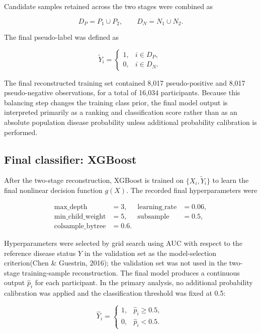 \documentclass[10pt]{article}
\begin{document}
Candidate samples retained across the two stages were combined as

\[D_{P} = P_{1} \cup P_{2},\quad\quad D_{N} = N_{1} \cup N_{2}.\]

The final pseudo-label was defined as

\[{\widetilde{Y}}_{i} = \left\{ \begin{matrix}
1, & i \in D_{P}, \\
0, & i \in D_{N}.
\end{matrix} \right.\ \]

The final reconstructed training set contained 8,017 pseudo-positive and
8,017 pseudo-negative observations, for a total of 16,034 participants.
Because this balancing step changes the training class prior, the final
model output is interpreted primarily as a ranking and classification
score rather than as an absolute population disease probability unless
additional probability calibration is performed.

\subsection{Final classifier: XGBoost}\label{final-classifier-xgboost}

After the two-stage reconstruction, XGBoost is trained on
\(\{ X_{i},{\widetilde{Y}}_{i}\}\) to learn the final nonlinear decision
function \(g(X)\). The recorded final hyperparameters were

\[
\begin{aligned}
\text{max\_depth} &= 3, & \text{learning\_rate} &= 0.06,\\
\text{min\_child\_weight} &= 5, & \text{subsample} &= 0.5,\\
\text{colsample\_bytree} &= 0.6. &&
\end{aligned}
\]

Hyperparameters were selected by grid search using AUC with respect to
the reference disease status \(Y\) in the validation set as the
model-selection criterion(Chen \& Guestrin, 2016); the validation set
was not used in the two-stage training-sample reconstruction. The final
model produces a continuous output \({\widehat{p}}_{i}\) for each
participant. In the primary analysis, no additional probability
calibration was applied and the classification threshold was fixed at
0.5:

\[{\widehat{Y}}_{i} = \left\{ \begin{matrix}
1, & {\widehat{p}}_{i} \geq 0.5, \\
0, & {\widehat{p}}_{i} < 0.5.
\end{matrix} \right.\ \]
\end{document}
